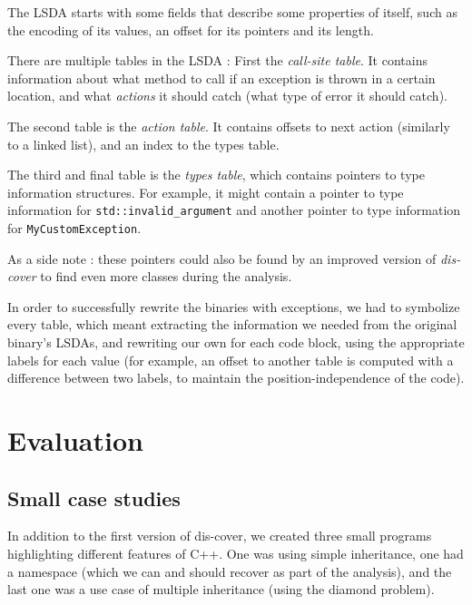 \documentclass[a4paper,11pt,oneside]{report}
\begin{document}
The LSDA starts with some fields that describe some properties of itself, such
as the encoding of its values, an offset for its pointers and its length.

There are multiple tables in the LSDA : First the \emph{call-site table}.
It contains information about what method to call if an exception is thrown in
a certain location, and what \emph{actions} it should catch (what type of
error it should catch).

The second table is the \emph{action table}. It contains offsets to next
action (similarly to a linked list), and an index to the types table.

The third and final table is the \emph{types table}, which contains pointers
to type information structures. For example, it might contain a pointer to
type information for \texttt{std::invalid\_argument} and another pointer to
type information for \texttt{MyCustomException}.

As a side note : these pointers could also be found by an improved version of
\emph{dis-cover} to find even more classes during the analysis.

In order to successfully rewrite the binaries with exceptions, we had to
symbolize every table, which meant extracting the information we needed from
the original binary's LSDAs, and rewriting our own for each code block, using
the appropriate labels for each value (for example, an offset to another table
is computed with a difference between two labels, to maintain the
position-independence of the code).


\chapter{Evaluation}
\label{evalchapter}




\section{Small case studies}

In addition to the first version of dis-cover, we created three small programs 
highlighting different features of C++.
One was using simple inheritance,
one had a namespace (which we can and should recover as part of the analysis),
and the last one was a use case of multiple inheritance (using the diamond 
problem).
\end{document}
